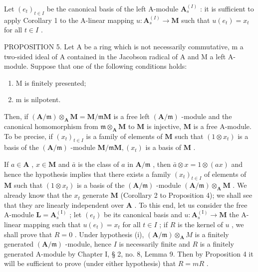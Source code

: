 Let \((e_t)_{t \in I}\) be the canonical basis of the left A-module \(\mathbf{A}_s^{(I)}\) : it is sufficient to apply Corollary 1 to the A-linear mapping \(u: \mathbf{A}_s^{(I)} \to \mathbf{M}\) such that \(u(e_t) = x_t\) for all \(t \in I\) .

PROPOSITION 5. Let A be a ring which is not necessarily commutative, m a two-sided ideal of A contained in the Jacobson radical of A and M a left A-module. Suppose that one of the following conditions holds:

\begin{enumerate}
\def\labelenumi{(\roman{enumi})}
\item
  M is finitely presented;
\item
  m is nilpotent.
\end{enumerate}

Then, if \((\mathbf{A} / \mathfrak{m})\otimes_{\mathbf{A}}\mathbf{M} = \mathbf{M} / \mathfrak{m}\mathbf{M}\) is a free left \((\mathbf{A} / \mathfrak{m})\) -module and the canonical homomorphism from \(\mathfrak{m}\otimes_{\mathbf{A}}\mathbf{M}\) to \(\mathbf{M}\) is injective, \(\mathbf{M}\) is a free A-module. To be precise, if \((x_{t})_{t\in I}\) is a family of elements of \(\mathbf{M}\) such that \((1\otimes x_{t})\) is a basis of the \((\mathbf{A} / \mathfrak{m})\) -module \(\mathbf{M} / \mathfrak{m}\mathbf{M}, (x_{t})\) is a basis of \(\mathbf{M}\) .

If \(a \in \mathbf{A}\) , \(x \in \mathbf{M}\) and \(\bar{a}\) is the class of \(a\) in \(\mathbf{A} / \mathfrak{m}\) , then \(\bar{a} \otimes x = 1 \otimes (ax)\) and hence the hypothesis implies that there exists a family \((x_{t})_{t \in I}\) of elements of \(\mathbf{M}\) such that \((1 \otimes x_{t})\) is a basis of the \((\mathbf{A} / \mathfrak{m})\) -module \((\mathbf{A} / \mathfrak{m}) \otimes_{\mathbf{A}} \mathbf{M}\) . We already know that the \(x_{t}\) generate \(\mathbf{M}\) (Corollary 2 to Proposition 4); we shall see that they are linearly independent over \(\mathbf{A}\) . To this end, let us consider the free A-module \(\mathbf{L} = \mathbf{A}_{s}^{(\mathrm{I})}\) ; let \((e_{t})\) be its canonical basis and \(u: \mathbf{A}_{s}^{(\mathrm{I})} \to \mathbf{M}\) the A-linear mapping such that \(u(e_{t}) = x_{t}\) for all \(t \in I\) ; if \(R\) is the kernel of \(u\) , we shall prove that \(R = 0\) . Under hypothesis (i), \((\mathbf{A} / \mathfrak{m}) \otimes_{\mathbf{A}} M\) is a finitely generated \((\mathbf{A} / \mathfrak{m})\) -module, hence \(I\) is necessarily finite and \(R\) is a finitely generated A-module by Chapter I, § 2, no. 8, Lemma 9. Then by Proposition 4 it will be sufficient to prove (under either hypothesis) that \(R = mR\) .

